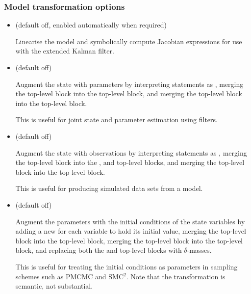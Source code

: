 \subsubsection{Model transformation options}
\begin{itemize}
\item {} (default off, enabled automatically when
  required)

Linearise the model and symbolically compute Jacobian expressions for use with
the extended Kalman filter.

\item {} (default off)

Augment the state with parameters by interpreting  statements as
, merging the  top-level block into the
 top-level block, and merging the
 top-level block into the
 top-level block.

This is useful for joint state and parameter estimation using filters.

\item {} (default off)

Augment the state with observations by interpreting  statements as
, merging the  top-level block into the
,  and 
top-level blocks, and merging the  top-level
block into the  top-level block.

This is useful for producing simulated data sets from a model.

\item {} (default off)

Augment the parameters with the initial conditions of the state variables by
adding a new  for each  variable to hold its initial
value, merging the  top-level block into the
 top-level block, merging the 
top-level block into the  top-level block, and
replacing both the  and
 top-level blocks with $\delta$-masses.

This is useful for treating the initial conditions as parameters in sampling
schemes such as PMCMC and SMC$^2$. Note that the transformation is semantic,
not substantial.

\end{itemize}
